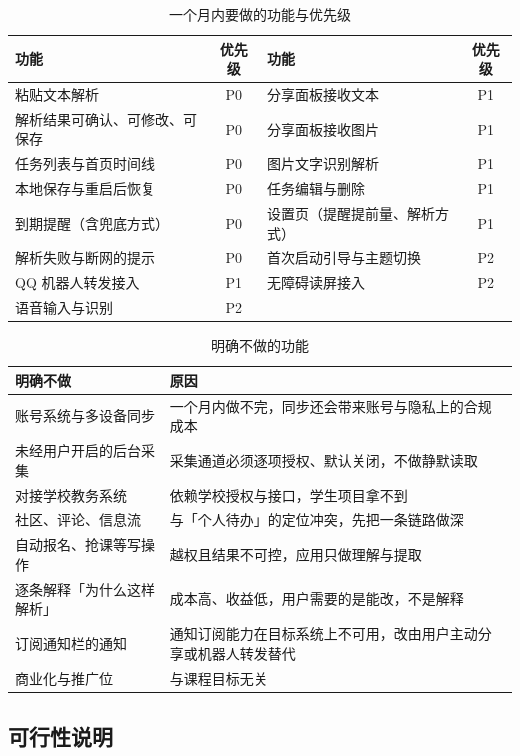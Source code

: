 \documentclass[12pt,a4paper,fontset=windows]{ctexart}
\begin{document}
\begin{table}[tbp]
\centering
\small
\begin{tabularx}{\textwidth}{@{}XcXc@{}}
\toprule
功能 & 优先级 & 功能 & 优先级 \\
\midrule
粘贴文本解析 & P0 & 分享面板接收文本 & P1 \\
解析结果可确认、可修改、可保存 & P0 & 分享面板接收图片 & P1 \\
任务列表与首页时间线 & P0 & 图片文字识别解析 & P1 \\
本地保存与重启后恢复 & P0 & 任务编辑与删除 & P1 \\
到期提醒（含兜底方式） & P0 & 设置页（提醒提前量、解析方式） & P1 \\
解析失败与断网的提示 & P0 & 首次启动引导与主题切换 & P2 \\
QQ 机器人转发接入 & P1 & 无障碍读屏接入 & P2 \\
语音输入与识别 & P2 & & \\
\bottomrule
\end{tabularx}
\caption{一个月内要做的功能与优先级}
\label{tab:mvp}
\end{table}

\begin{table}[tbp]
\centering
\small
\begin{tabularx}{\textwidth}{@{}p{4.8cm}X@{}}
\toprule
明确不做 & 原因 \\
\midrule
账号系统与多设备同步 & 一个月内做不完，同步还会带来账号与隐私上的合规成本 \\
未经用户开启的后台采集 & 采集通道必须逐项授权、默认关闭，不做静默读取 \\
对接学校教务系统 & 依赖学校授权与接口，学生项目拿不到 \\
社区、评论、信息流 & 与「个人待办」的定位冲突，先把一条链路做深 \\
自动报名、抢课等写操作 & 越权且结果不可控，应用只做理解与提取 \\
逐条解释「为什么这样解析」 & 成本高、收益低，用户需要的是能改，不是解释 \\
订阅通知栏的通知 & 通知订阅能力在目标系统上不可用，改由用户主动分享或机器人转发替代 \\
商业化与推广位 & 与课程目标无关 \\
\bottomrule
\end{tabularx}
\caption{明确不做的功能}
\label{tab:notdo}
\end{table}

\subsection{可行性说明}
\end{document}
